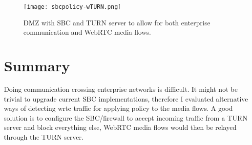 \begin{figure}[here]
\centerline{\texttt{[image: sbcpolicy-wTURN.png]}}
\caption{DMZ with SBC and TURN server to allow for both enterprise communication and WebRTC media flows.}
\label{fig:sbc-turn}
\end{figure}

\newpage
\section{Summary}
Doing communication crossing enterprise networks is difficult. It might not be trivial to upgrade current SBC implementations, therefore I evaluated alternative ways of detecting \gls{wrtc} traffic for applying policy to the media flows. A good solution is to configure the SBC/firewall to accept incoming traffic from a TURN server and block everything else, WebRTC media flows would then be relayed through the TURN server.